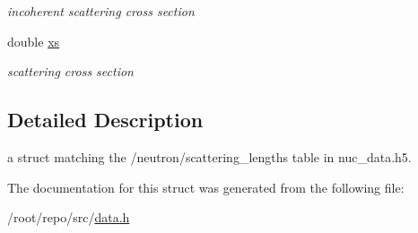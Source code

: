 \begin{DoxyCompactItemize}
\begin{DoxyCompactList}\small\item\em incoherent scattering cross section \end{DoxyCompactList}\item 
\mbox{\label{structpyne_1_1scattering__lengths_aaaab6ef13d13f4058b263f0d28da9ac3}} 
double \hyperlink{structpyne_1_1scattering__lengths_aaaab6ef13d13f4058b263f0d28da9ac3}{xs}
\begin{DoxyCompactList}\small\item\em scattering cross section \end{DoxyCompactList}\end{DoxyCompactItemize}


\subsection{Detailed Description}
a struct matching the \textquotesingle{}/neutron/scattering\+\_\+lengths\textquotesingle{} table in nuc\+\_\+data.\+h5. 

The documentation for this struct was generated from the following file\+:\begin{DoxyCompactItemize}
\item 
/root/repo/src/\hyperlink{data_8h}{data.\+h}\end{DoxyCompactItemize}
